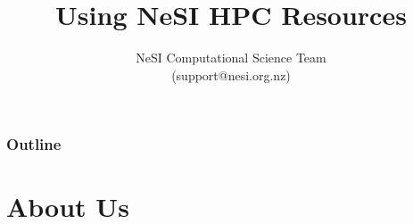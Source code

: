 \documentclass{beamer}
\title{Using NeSI HPC Resources}
\author{NeSI Computational Science Team \\(support@nesi.org.nz)}
\date{}
\newcommand\BackgroundPicture[1]{%
\setbeamertemplate{background}{%
\parbox[c][\paperheight]{\paperwidth}{%
\vfill \hfill \texttt{[image: \#1]}
\hfill \vfill
}}}
\begin{document}
{
\begin{frame}[plain]
\vspace{1cm}
\titlepage
\end{frame}
}


\begin{frame}
\frametitle{Outline}
\begin{multicols}{2}
   \tableofcontents
 \end{multicols}
 \end{frame}



\section{About Us}
\end{document}
